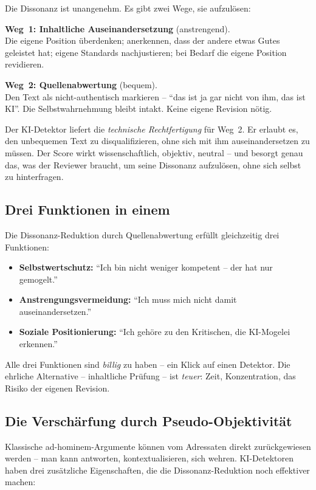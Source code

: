 Die Dissonanz ist unangenehm. Es gibt zwei Wege, sie aufzulösen:

\textbf{Weg~1: Inhaltliche Auseinandersetzung} (anstrengend).\\
Die eigene Position überdenken; anerkennen, dass der andere etwas
Gutes geleistet hat; eigene Standards nachjustieren; bei Bedarf die
eigene Position revidieren.

\textbf{Weg~2: Quellenabwertung} (bequem).\\
Den Text als nicht-authentisch markieren -- \enquote{das ist ja gar
nicht von ihm, das ist KI}. Die Selbstwahrnehmung bleibt intakt.
Keine eigene Revision nötig.

Der KI-Detektor liefert die \emph{technische Rechtfertigung} für
Weg~2. Er erlaubt es, den unbequemen Text zu disqualifizieren, ohne
sich mit ihm auseinandersetzen zu müssen. Der Score wirkt
wissenschaftlich, objektiv, neutral -- und besorgt genau das, was
der Reviewer braucht, um seine Dissonanz aufzulösen, ohne sich
selbst zu hinterfragen.

\subsection{Drei Funktionen in einem}

Die Dissonanz-Reduktion durch Quellenabwertung erfüllt
gleichzeitig drei Funktionen:

\begin{itemize}[leftmargin=2em,itemsep=2pt,topsep=2pt]
  \item \textbf{Selbstwertschutz:} \enquote{Ich bin nicht weniger
        kompetent -- der hat nur gemogelt.}
  \item \textbf{Anstrengungsvermeidung:} \enquote{Ich muss mich
        nicht damit auseinandersetzen.}
  \item \textbf{Soziale Positionierung:} \enquote{Ich gehöre zu
        den Kritischen, die KI-Mogelei erkennen.}
\end{itemize}

Alle drei Funktionen sind \emph{billig} zu haben -- ein Klick auf
einen Detektor. Die ehrliche Alternative -- inhaltliche Prüfung --
ist \emph{teuer}: Zeit, Konzentration, das Risiko der eigenen
Revision.

\subsection{Die Verschärfung durch Pseudo-Objektivität}

Klassische ad-hominem-Argumente können vom Adressaten direkt
zurückgewiesen werden -- man kann antworten, kontextualisieren,
sich wehren. KI-Detektoren haben drei zusätzliche Eigenschaften,
die die Dissonanz-Reduktion noch effektiver machen:

